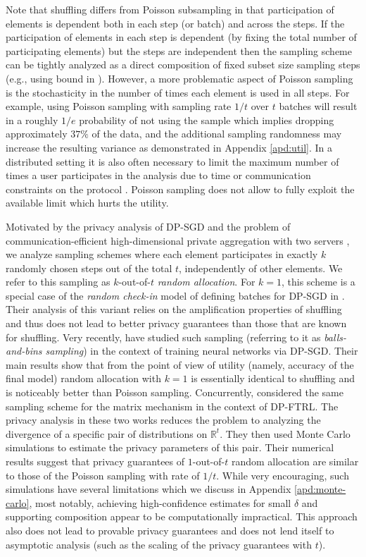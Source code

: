 \documentclass{article}
\theoremstyle{plain}
\theoremstyle{definition}
\newcommand{\reals}{\mathbb{R}}
\begin{document}
Note that shuffling differs from Poisson subsampling in that participation of elements is dependent both in each step (or batch) and across the steps. If the participation of elements in each step is dependent (by fixing the total number of participating elements) but the steps are independent then the sampling scheme can be tightly analyzed as a direct composition of fixed subset size sampling steps (e.g., using bound in \citet{BBG18,ZDW22}).
However, a more problematic aspect of Poisson sampling is the stochasticity in the number of times each element is used in all steps. For example, using Poisson sampling with sampling rate $1/t$ over $t$ batches will result in a roughly $1/e$ probability of not using the sample which implies dropping approximately $37\%$ of the data, and the additional sampling randomness may increase the resulting variance as demonstrated in Appendix \ref{apd:util}. In a distributed setting it is also often necessary to limit the maximum number of times a user participates in the analysis due to time or communication constraints on the protocol \citep{CSOK24,AFKRT25}. Poisson sampling does not allow to fully exploit the available limit which hurts the utility. 

Motivated by the privacy analysis of DP-SGD and the problem of communication-efficient high-dimensional private aggregation with two servers \citep{AFKRT25}, we analyze sampling schemes where each element participates in exactly $k$ randomly chosen steps out of the total $t$, independently of other elements. We refer to this sampling as $k$-out-of-$t$ {\em random allocation}.
For $k=1$, this scheme is a special case of the {\em random check-in} model of defining batches for DP-SGD in \citep{BKMT20}. Their analysis of this variant relies on the amplification properties of shuffling and thus does not lead to better privacy guarantees than those that are known for shuffling. Very recently, \citet{CGHLKKMSZ24} have studied such sampling (referring to it as {\em balls-and-bins sampling}) in the context of training neural networks via DP-SGD. Their main results show that from the point of view of utility (namely, accuracy of the final model) random allocation with $k=1$ is essentially identical to shuffling and is noticeably better than Poisson sampling. Concurrently, \citet{CCGHST25} considered the same sampling scheme for the matrix mechanism in the context of DP-FTRL. The privacy analysis in these two works reduces the problem to analyzing the divergence of a specific pair of distributions on $\reals^t$. They then used Monte Carlo simulations to estimate the privacy parameters of this pair. Their numerical results suggest that privacy guarantees of $1$-out-of-$t$ random allocation are similar to those of the Poisson sampling with rate of $1/t$. While very encouraging, such simulations have several limitations which we discuss in Appendix \ref{apd:monte-carlo}, most notably, achieving high-confidence estimates for small $\delta$ and supporting composition appear to be computationally impractical. This approach also does not lead to provable privacy guarantees and does not lend itself to asymptotic analysis (such as the scaling of the privacy guarantees with $t$).
\end{document}
